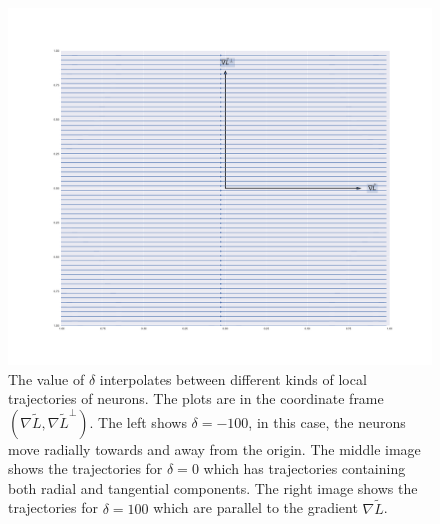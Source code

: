 \begin{figure}
    \includegraphics[width=\linewidth]{figures/dynamics_delta_100.pdf}
    \endminipage
    
    \caption{The value of $\delta$ interpolates between different kinds of local trajectories of neurons. The plots are in the coordinate frame $(\nabla \tilde{L}, \nabla \tilde{L}^\bot)$. The left shows $\delta = -100$, in this case, the neurons move radially towards and away from the origin. The middle image shows the trajectories for $\delta = 0$ which has trajectories containing both radial and tangential components. The right image shows the trajectories for $\delta = 100$ which are parallel to the gradient $\nabla \tilde{L}$.}
    \label{fig:my_label}
\end{figure}

